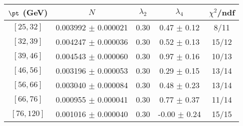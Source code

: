 \begin{tabular}{c||c|c|c|c}
$\pt$ (GeV) & $N$ & $\lambda_{2}$ & $\lambda_4$  & $\chi^2$/ndf  \\
\hline
$[25, 32]$ & 0.003992 $\pm$ 0.000021 & 0.30 & 0.47 $\pm$ 0.12 & 8/11\\
$[32, 39]$ & 0.004247 $\pm$ 0.000036 & 0.30 & 0.52 $\pm$ 0.13 & 15/12\\
$[39, 46]$ & 0.004543 $\pm$ 0.000060 & 0.30 & 0.97 $\pm$ 0.16 & 10/13\\
$[46, 56]$ & 0.003196 $\pm$ 0.000053 & 0.30 & 0.29 $\pm$ 0.15 & 13/14\\
$[56, 66]$ & 0.003040 $\pm$ 0.000084 & 0.30 & 0.48 $\pm$ 0.23 & 13/14\\
$[66, 76]$ & 0.000955 $\pm$ 0.000041 & 0.30 & 0.77 $\pm$ 0.37 & 11/14\\
$[76, 120]$ & 0.001016 $\pm$ 0.000040 & 0.30 & -0.00 $\pm$ 0.24 & 15/15\\
\end{tabular}
